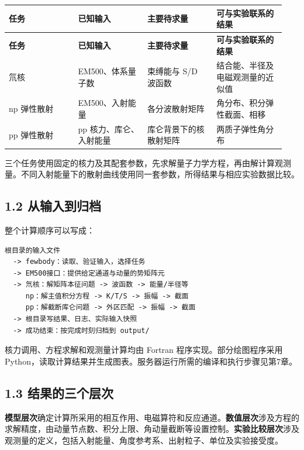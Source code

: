 \documentclass[UTF8,a4paper,zihao=5,fontset=fandol]{ctexart}
\begin{document}
{\small\setlength{\tabcolsep}{3pt}\renewcommand{\arraystretch}{1.28}
\begin{longtable}{@{}>{\raggedright\arraybackslash}p{0.235\linewidth}>{\raggedright\arraybackslash}p{0.235\linewidth}>{\raggedright\arraybackslash}p{0.235\linewidth}>{\raggedright\arraybackslash}p{0.235\linewidth}@{}}\toprule
\textbf{任务} & \textbf{已知输入} & \textbf{主要待求量} & \textbf{可与实验联系的结果}\\\midrule
\endfirsthead
\textbf{任务} & \textbf{已知输入} & \textbf{主要待求量} & \textbf{可与实验联系的结果}\\\midrule
\endhead
氘核 & EM500、体系量子数 & 束缚能与 S/D 波函数 & 结合能、半径及电磁观测量的近似值\\
np 弹性散射 & EM500、入射能量 & 各分波散射矩阵 & 角分布、积分弹性截面、相移\\
pp 弹性散射 & pp 核力、库仑、入射能量 & 库仑背景下的核散射矩阵 & 两质子弹性角分布\\
\bottomrule\end{longtable}}
三个任务使用固定的核力及其配套参数，先求解量子力学方程，再由解计算观测量。不同入射能量下的散射曲线使用同一套参数，所得结果与相应实验数据比较。

\subsection*{1.2 从输入到归档}
整个计算顺序可以写成：


\begin{Verbatim}[samepage=true,breaklines=true,breakanywhere=true,fontsize=\small,frame=leftline,framesep=3mm,rulecolor=\color{bluegray}]
根目录的输入文件
  -> fewbody：读取、验证输入，选择任务
  -> EM500接口：提供给定通道与动量的势矩阵元
  -> 氘核：解矩阵本征问题 -> 波函数 -> 能量/半径等
     np：解主值积分方程 -> K/T/S -> 振幅 -> 截面
     pp：解截断库仑问题 -> 外区匹配 -> 振幅 -> 截面
  -> 根目录写结果、日志、实际输入快照
  -> 成功结束：按完成时刻归档到 output/
\end{Verbatim}
核力调用、方程求解和观测量计算均由 Fortran 程序实现。部分绘图程序采用 Python，读取计算结果并生成图表。服务器运行所需的编译和执行步骤见第7章。

\subsection*{1.3 结果的三个层次}
\textbf{模型层次}确定计算所采用的相互作用、电磁算符和反应通道。\textbf{数值层次}涉及方程的求解精度，由动量节点数、积分上限、角动量截断等设置控制。\textbf{实验比较层次}涉及观测量的定义，包括入射能量、角度参考系、出射粒子、单位及实验接受度。
\end{document}
